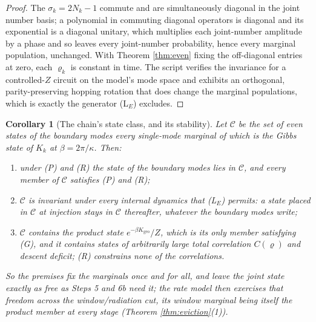 \documentclass[11pt]{article}
\newtheorem{corollary}[theorem]{Corollary}
\theoremstyle{definition}
\begin{document}
\begin{proof}
The $\sigma_k = 2N_k - 1$ commute and are simultaneously diagonal in the joint number basis; a polynomial in commuting diagonal operators is diagonal and its exponential is a diagonal unitary, which multiplies each joint-number amplitude by a phase and so leaves every joint-number probability, hence every marginal population, unchanged. With Theorem \ref{thm:even} fixing the off-diagonal entries at zero, each $\varrho_k$ is constant in time. The script verifies the invariance for a controlled-$Z$ circuit on the model's mode space and exhibits an orthogonal, parity-preserving hopping rotation that does change the marginal populations, which is exactly the generator (L$_E$) excludes.
\end{proof}

\begin{corollary}[The chain's state class, and its stability]\label{cor:stateclass}
Let $\mathcal{C}$ be the set of even states of the boundary modes every single-mode marginal of which is the Gibbs state of $K_k$ at $\beta = 2\pi/\kappa$. Then:
\begin{enumerate}
\item under (P) and (R) the state of the boundary modes lies in $\mathcal{C}$, and every member of $\mathcal{C}$ satisfies (P) and (R);
\item $\mathcal{C}$ is invariant under every internal dynamics that (L$_E$) permits: a state placed in $\mathcal{C}$ at injection stays in $\mathcal{C}$ thereafter, whatever the boundary modes write;
\item $\mathcal{C}$ contains the product state $e^{-\beta K_{\mathrm{geo}}}/Z$, which is its only member satisfying (G), and it contains states of arbitrarily large total correlation $C(\varrho)$ and descent deficit; (R) constrains none of the correlations.
\end{enumerate}
So the premises fix the marginals once and for all, and leave the joint state exactly as free as Steps 5 and 6b need it; the rate model then exercises that freedom across the window/radiation cut, its window marginal being itself the product member at every stage (Theorem \ref{thm:eviction}(1)).
\end{corollary}
\end{document}

